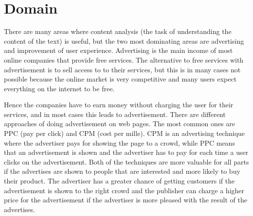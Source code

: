 \documentclass[english,a4paper]{ifimaster}
\begin{document}


\chapter{Domain}
There are many areas where content analysis (the task of understanding the content of the text) is useful, but the two most dominating areas are advertising and improvement of user experience. 
Advertising is the main income of most online companies that provide free services. The alternative to free services with advertisement is to sell access to to their services, but this is in many cases not possible because the online market is very competitive and many users expect everything on the internet to be free. 


Hence the companies have to earn money without charging the user for their services, and in most cases  this  leads to advertisement. There are different approaches of doing advertisement on web pages. The most common ones are PPC (pay per click) and CPM (cost per mille). CPM is an  advertising technique where the advertiser pays for showing the page to a crowd, while PPC means that an advertisement is shown and the advertiser has to pay for each time a user clicks on the advertisement. Both of the techniques are more valuable for all parts if the advertises are shown to people that are interested and more likely to buy their product. The advertiser has a greater chance of getting customers if the advertisement is shown to the right crowd and the publisher can charge a higher price for the advertisement if the advertiser is more pleased with the result of the advertises.
\end{document}
